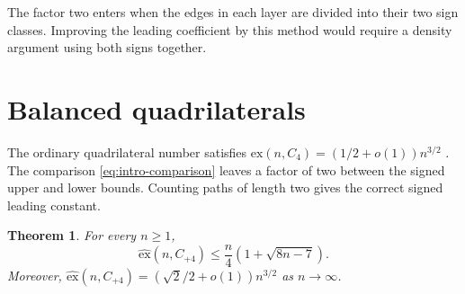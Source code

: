 \documentclass{article}
\newcommand{\ex}{\mathrm{ex}}
\newcommand{\hex}{\widehat{\ex}}
\newtheorem{theorem}{Theorem}[section]
\theoremstyle{definition}
\theoremstyle{remark}
\begin{document}
The factor two enters when the edges in each layer are divided into their
two sign classes.  Improving the leading coefficient by this method would
require a density argument using both signs together.

\section{Balanced quadrilaterals}\label{sec:C4}

The ordinary quadrilateral number satisfies
$\ex(n,C_4)=(1/2+o(1))n^{3/2}$
\cite{MR101250,ErdosRenyiSos66,FurediC4}.  The comparison
\eqref{eq:intro-comparison} leaves a factor of two between the signed
upper and lower bounds.  Counting paths of length two gives the correct
signed leading constant.

\begin{theorem}\label{thm:C4-upper}\label{thm:C4-asymptotic}
For every $n\geq1$,
\[
\hex(n,C_{+4})\leq\frac n4\left(1+\sqrt{8n-7}\right).
\]
Moreover, $\hex(n,C_{+4})=(\sqrt2/2+o(1))n^{3/2}$ as $n\to\infty$.
\end{theorem}
\end{document}

